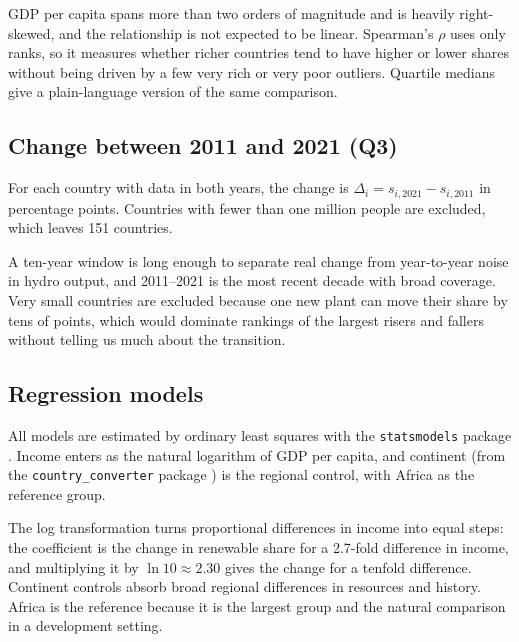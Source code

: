\documentclass[11pt,a4paper]{article}
\newcommand{\code}[1]{\texttt{\small #1}}
\begin{document}
\begin{why}
GDP per capita spans more than two orders of magnitude and is heavily right-skewed, and the relationship is not expected to be linear. Spearman's $\rho$ uses only ranks, so it measures whether richer countries tend to have higher or lower shares without being driven by a few very rich or very poor outliers. Quartile medians give a plain-language version of the same comparison.
\end{why}

\subsection{Change between 2011 and 2021 (Q3)}
For each country with data in both years, the change is $\Delta_i = s_{i,2021} - s_{i,2011}$ in percentage points. Countries with fewer than one million people are excluded, which leaves 151 countries.

\begin{why}
A ten-year window is long enough to separate real change from year-to-year noise in hydro output, and 2011--2021 is the most recent decade with broad coverage. Very small countries are excluded because one new plant can move their share by tens of points, which would dominate rankings of the largest risers and fallers without telling us much about the transition.
\end{why}

\subsection{Regression models}\label{sec:models}
All models are estimated by ordinary least squares with the \code{statsmodels} package \citep{seabold2010}. Income enters as the natural logarithm of GDP per capita, and continent (from the \code{country\_converter} package \citep{stadler2017}) is the regional control, with Africa as the reference group.

\begin{why}
The log transformation turns proportional differences in income into equal steps: the coefficient is the change in renewable share for a 2.7-fold difference in income, and multiplying it by $\ln 10 \approx 2.30$ gives the change for a tenfold difference. Continent controls absorb broad regional differences in resources and history. Africa is the reference because it is the largest group and the natural comparison in a development setting.
\end{why}
\end{document}
